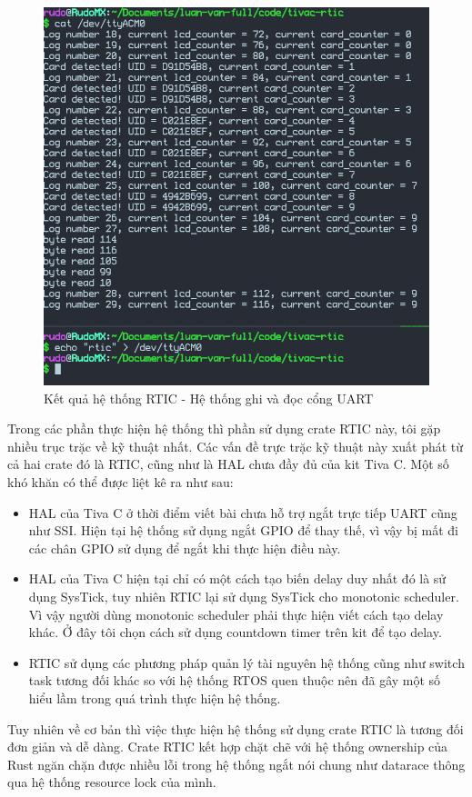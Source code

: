 \begin{figure}[ht]
\centering
\includegraphics[scale=0.5]{images/rtic_uart.png}
\caption{Kết quả hệ thống RTIC - Hệ thống ghi và đọc cổng UART}
\label{fig:rtic_uart}
\end{figure}

\clearpage
Trong các phần thực hiện hệ thống thì phần sử dụng crate RTIC này, tôi gặp nhiều trục trặc về kỹ thuật nhất.
Các vấn đề trực trặc kỹ thuật này xuất phát từ cả hai crate đó là RTIC, cũng như là HAL chưa đầy đủ của kit Tiva C.
Một số khó khăn có thể được liệt kê ra như sau:
\begin{itemize}
    \item HAL của Tiva C ở thời điểm viết bài chưa hỗ trợ ngắt trực tiếp UART cũng như SSI.
        Hiện tại hệ thống sử dụng ngắt GPIO để thay thế, vì vậy bị mất đi các chân GPIO sử dụng để ngắt khi thực hiện điều này.
    \item HAL của Tiva C hiện tại chỉ có một cách tạo biến delay duy nhất đó là sử dụng SysTick, tuy nhiên RTIC lại sử dụng SysTick cho monotonic scheduler.
        Vì vậy người dùng monotonic scheduler phải thực hiện viết cách tạo delay khác.
        Ở đây tôi chọn cách sử dụng countdown timer trên kit để tạo delay.
    \item RTIC sử dụng các phương pháp quản lý tài nguyên hệ thống cũng như switch task tương đối khác so với hệ thống RTOS quen thuộc nên đã gây một số hiểu lầm trong quá trình thực hiện hệ thống.
\end{itemize}

Tuy nhiên về cơ bản thì việc thực hiện hệ thống sử dụng crate RTIC là tương đối đơn giản và dễ dàng.
Crate RTIC kết hợp chặt chẽ với hệ thống ownership của Rust ngăn chặn được nhiều lỗi trong hệ thống ngắt nói chung như datarace thông qua hệ thống resource lock của mình.
